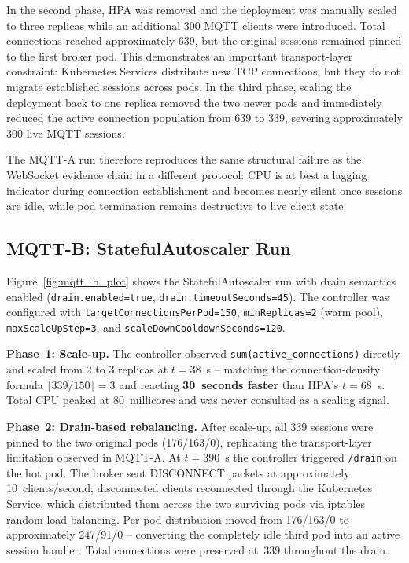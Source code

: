 \documentclass[twocolumn]{svjour3}
\begin{document}
In the second phase, HPA was removed and the deployment was manually scaled to three replicas while an additional 300 MQTT clients were introduced. Total connections reached approximately 639, but the original sessions remained pinned to the first broker pod. This demonstrates an important transport-layer constraint: Kubernetes Services distribute new TCP connections, but they do not migrate established sessions across pods. In the third phase, scaling the deployment back to one replica removed the two newer pods and immediately reduced the active connection population from 639 to 339, severing approximately 300 live MQTT sessions.

The MQTT-A run therefore reproduces the same structural failure as the WebSocket evidence chain in a different protocol: CPU is at best a lagging indicator during connection establishment and becomes nearly silent once sessions are idle, while pod termination remains destructive to live client state.

\subsection{MQTT-B: StatefulAutoscaler Run}

Figure~\ref{fig:mqtt_b_plot} shows the StatefulAutoscaler run with drain semantics enabled (\texttt{drain.enabled=true}, \texttt{drain.timeoutSeconds=45}). The controller was configured with \texttt{targetConnectionsPerPod=150}, \texttt{minReplicas=2} (warm pool), \texttt{maxScaleUpStep=3}, and \texttt{scaleDownCooldownSeconds=120}.

\textbf{Phase~1: Scale-up.} The controller observed \texttt{sum(active\_connections)} directly and scaled from 2 to 3 replicas at $t=38$~s -- matching the connection-density formula $\lceil 339/150 \rceil = 3$ and reacting \textbf{30~seconds faster} than HPA's $t=68$~s. Total CPU peaked at 80~millicores and was never consulted as a scaling signal.

\textbf{Phase~2: Drain-based rebalancing.} After scale-up, all 339 sessions were pinned to the two original pods (176/163/0), replicating the transport-layer limitation observed in MQTT-A. At $t=390$~s the controller triggered \texttt{/drain} on the hot pod. The broker sent DISCONNECT packets at approximately 10~clients/second; disconnected clients reconnected through the Kubernetes Service, which distributed them across the two surviving pods via iptables random load balancing. Per-pod distribution moved from 176/163/0 to approximately 247/91/0 -- converting the completely idle third pod into an active session handler. Total connections were preserved at~339 throughout the drain.
\end{document}
